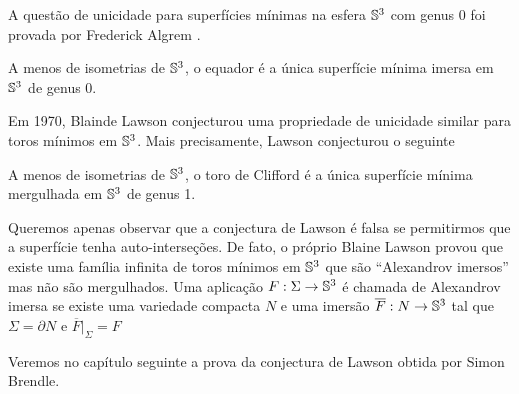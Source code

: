 
A questão de unicidade para superfícies mínimas na esfera $\mathbb{S}^3$ com genus 0 foi provada por Frederick Algrem \cite{Almgren1966}.

\begin{teorema}[Almgren]
	A menos de isometrias de $\mathbb{S}^3$, o equador é a única superfície mínima imersa em $\mathbb{S}^3$ de genus 0.
\end{teorema}


%


Em 1970, Blainde Lawson conjecturou uma propriedade de unicidade similar para toros mínimos em $\mathbb{S}^3$. Mais precisamente, Lawson \cite{Lawson1970} conjecturou o seguinte

\begin{conjectura}[Lawson]
	A menos de isometrias de $\mathbb{S}^3$, o toro de Clifford é a única superfície mínima mergulhada em $\mathbb{S}^3$ de genus 1.
\end{conjectura}

Queremos apenas observar que a conjectura de Lawson é falsa se permitirmos que a superfície tenha auto-interseções. De fato, o próprio Blaine Lawson \cite{Lawson1969} provou que existe uma família infinita de toros mínimos em $\mathbb{S}^3$ que são ``Alexandrov imersos'' mas não são mergulhados. Uma aplicação $F: \Sigma \rightarrow \mathbb{S}^3$ é chamada de Alexandrov imersa se existe uma variedade compacta $N$ e uma imersão $\overline{F}: N \rightarrow \mathbb{S}^3$ tal que $\Sigma = \partial N$ e $\overline{F} \vert_{\Sigma}  = F$

Veremos no capítulo seguinte a prova da conjectura de Lawson obtida por Simon Brendle.

%

